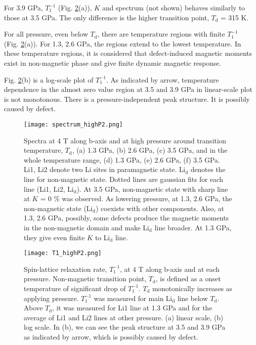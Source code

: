 \documentclass[a4,10.5pt]{report}
\begin{document}
For 3.9 GPa, $T^{-1}_1$ (Fig. \ref{T1_highP}(a)), $K$ and spectrum (not shown) behaves similarly to those at 3.5 GPa. 
The only difference is the higher transition point, $T_{\mathrm{d}}$ = 315 K.

For all pressure, even below $T_{\mathrm{d}}$, there are temperature regions with finite $T^{-1}_1$ (Fig. \ref{T1_highP}(a)). 
For 1.3, 2.6 GPa, the regions extend to the lowest temperature. 
In these temperature regions, it is considered that defect-induced magnetic moments exist in non-magnetic phase and give finite dynamic magnetic response.

Fig. \ref{T1_highP}(b) is a log-scale plot of $T^{-1}_1$.
As indicated by arrow, temperature dependence in the almost zero value region at 3.5 and 3.9 GPa in linear-scale plot is not monotonous.
There is a pressure-independent peak structure.
It is possibly caused by defect.

\begin{figure}[H]
  \centering
  \texttt{[image: spectrum\_highP2.png]}
  \caption{Spectra at 4 T along b-axis and at high pressure around transition temperature, $T_\mathrm{d}$, (a) 1.3 GPa, (b) 2.6 GPa, (c) 3.5 GPa,
  and in the whole temperature range, (d) 1.3 GPa, (e) 2.6 GPa, (f) 3.5 GPa.
  Li1, Li2 denote two Li sites in paramagnetic state. 
  Li$_\mathrm{d}$ denotes the line for non-magnetic state. 
  Dotted lines are gaussian fits for each line (Li1, Li2, Li$_\mathrm{d}$).  
  At 3.5 GPa, non-magnetic state with sharp line at $K$ = 0 \% was observed. 
  As lowering pressure, at 1.3, 2.6 GPa, the non-magnetic state (Li$_\mathrm{d}$) coexists with other components. 
  Also, at 1.3, 2.6 GPa, possibly, some defects produce the magnetic moments in the non-magnetic domain and make Li$_\mathrm{d}$ line broader. 
  At 1.3 GPa, they give even finite $K$ to Li$_\mathrm{d}$ line.}
  \label{spectrum_highP}
\end{figure}

\begin{figure}[H]
  \centering
  \texttt{[image: T1\_highP2.png]}
  \caption{Spin-lattice relaxation rate, $T^{-1}_1$, at 4 T along b-axis and at each pressure. 
  Non-magnetic transition point, $T_\mathrm{d}$, is defined as a onset temperature of significant drop of $T^{-1}_1$.
  $T_\mathrm{d}$ monotonically increases as applying pressure.
  $T^{-1}_1$ was measured for main Li$_\mathrm{d}$ line below $T_\mathrm{d}$.
  Above $T_\mathrm{d}$, it was measured for Li1 line at 1.3 GPa and for the average of Li1 and Li2 lines at other pressure.
  (a) linear scale, (b) log scale.
  In (b), we can see the peak structure at 3.5 and 3.9 GPa as indicated by arrow, which is possibly caused by defect.}
  \label{T1_highP}
\end{figure}
\end{document}
